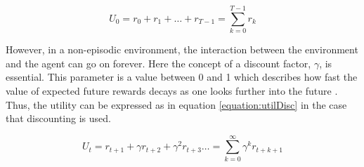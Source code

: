 \begin{equation}
\label{equation:utilNondisc}
U_0 = r_{0} + r_{1} + \dots + r_{T-1}
  = \sum\limits_{k = 0}^{T-1} r_{k}
\end{equation}

However, in a non-episodic environment, the interaction between the environment and the agent can go on forever.
Here the concept of a discount factor, $\gamma$, is essential. This parameter
is a value between 0 and 1 which describes how fast the value of expected
future rewards decays as one looks further into the future
\parencite{barto1998reinforcement}. Thus, the utility can be expressed as in
equation \eqref{equation:utilDisc} in the case that discounting is used. 

\begin{equation}
\label{equation:utilDisc}
U_{t} = r_{t + 1} + \gamma r_{t + 2} + \gamma^2 r_{t + 3} \dots
  =  \sum\limits_{k = 0}^\infty \gamma^kr_{t+k+1}
\end{equation}






